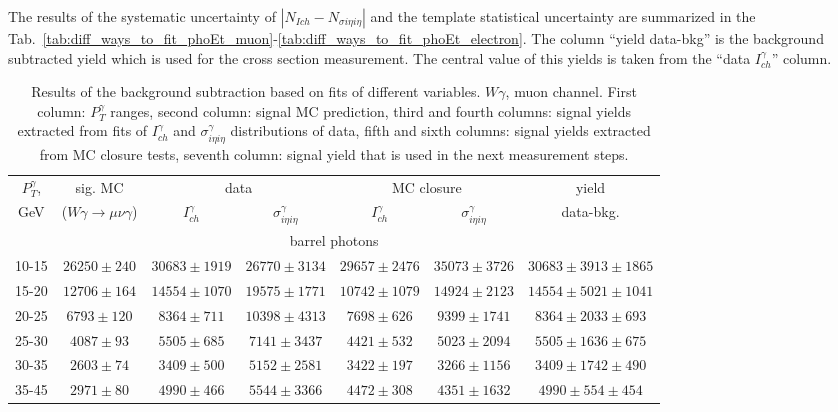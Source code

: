 The results of the systematic uncertainty of $|N_{Ich}-N_{\sigma i\eta i\eta}|$ and the template statistical uncertainty are summarized in the Tab.~\ref{tab:diff_ways_to_fit_phoEt_muon}-\ref{tab:diff_ways_to_fit_phoEt_electron}. The column ``yield data-bkg'' is the background subtracted yield which is used for the cross section measurement. The central value of this yields is taken from the ``data $I_{ch}^{\gamma}$'' column. %

\begin{table}[h]
  \tiny
  \begin{center}
  \caption{Results of the background subtraction based on fits of different variables. $W\gamma$, muon channel. First column: $P_T^{\gamma}$ ranges, second column: signal MC prediction, third and fourth columns: signal yields extracted from fits of $I_{ch}^{\gamma}$ and $\sigma_{i\eta i\eta}^\gamma$ distributions of data, fifth and sixth columns: signal yields extracted from MC closure tests, seventh column: signal yield that is used in the next measurement steps.}
  \begin{tabular}{|c|c|c|c|c|c|c|}
    $P_T^{\gamma}$, &  sig. MC   & \multicolumn{2}{|c|}{data}  & \multicolumn{2}{|c|}{MC closure} & yield\\ 
    GeV & ($W\gamma\rightarrow\mu\nu\gamma$) & $I_{ch}^{\gamma}$ & $\sigma_{i\eta i\eta}^\gamma$  & $I_{ch}^{\gamma}$  & $\sigma_{i\eta i\eta}^\gamma$   & data-bkg. \\ \hline
    \multicolumn{7}{|c|}{barrel photons} \\ \hline
    10-15 & $26250\pm240$ & $30683\pm1919$ & $26770\pm3134$ & $29657\pm2476$ & $35073\pm3726$ &$30683\pm3913\pm1865$  \\ \hline
    15-20 & $12706\pm164$ & $14554\pm1070$ & $19575\pm1771$ & $10742\pm1079$ & $14924\pm2123$ &$14554\pm5021\pm1041$  \\ \hline
    20-25 & $6793\pm120$ & $8364\pm711$ & $10398\pm4313$ & $7698\pm626$ & $9399\pm1741$ &$8364\pm2033\pm693$  \\ \hline
    25-30 & $4087\pm93$ & $5505\pm685$ & $7141\pm3437$ & $4421\pm532$ & $5023\pm2094$ &$5505\pm1636\pm675$  \\ \hline
    30-35 & $2603\pm74$ & $3409\pm500$ & $5152\pm2581$ & $3422\pm197$ & $3266\pm1156$ &$3409\pm1742\pm490$  \\ \hline
    35-45 & $2971\pm80$ & $4990\pm466$ & $5544\pm3366$ & $4472\pm308$ & $4351\pm1632$ &$4990\pm554\pm454$  \\ \hline

\end{tabular}
\end{center}
\end{table}
